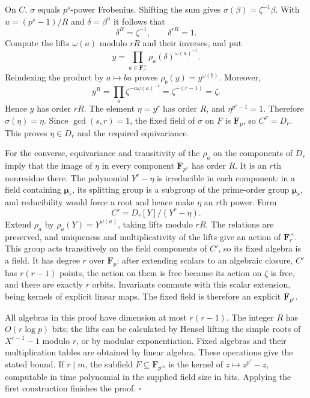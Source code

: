 On $C$, $\sigma$ equals $p^s$-power Frobenius. Shifting the sum gives
$\sigma(\beta)=\zeta^{-1}\beta$. With $u=(p^s-1)/R$ and
$\delta=\beta^u$ it follows that
\[
                  \delta^R=\zeta^{-1},\qquad \delta^{rR}=1.
\]
Compute the lifts $\omega(a)$ modulo $rR$ and their inverses, and put
\[
          y=\prod_{a\in\mathbf F_r^\times}
                        \rho_a(\delta)^{\omega(a)^{-1}}.
\]
Reindexing the product by $a\mapsto ba$ proves
$\rho_b(y)=y^{\omega(b)}$. Moreover,
\[
          y^R=\prod_a\zeta^{-a\omega(a)^{-1}}
                   =\zeta^{-(r-1)}=\zeta.
\]
Hence $y$ has order $rR$. The element $\eta=y^r$ has order $R$,
and $\eta^{p^s-1}=1$. Therefore $\sigma(\eta)=\eta$.
Since $\gcd(s,r)=1$, the fixed field of $\sigma$ on $F$ is
$\mathbf F_p$, so $C^\sigma=D_r$. This proves $\eta\in D_r$ and
the required equivariance.

For the converse, equivariance and transitivity of the $\rho_a$ on the
components of $D_r$ imply that the image of $\eta$ in every component
$\mathbf F_{p^s}$ has order $R$. It is an $r$th nonresidue there.
The polynomial $Y^r-\eta$ is irreducible in each component: in a field
containing $\boldsymbol\mu_r$, its splitting group is a subgroup of
the prime-order group $\boldsymbol\mu_r$, and reducibility would force
a root and hence make $\eta$ an $r$th power. Form
\[
                       C'=D_r[Y]/(Y^r-\eta).
\]
Extend $\rho_a$ by $\rho_a(Y)=Y^{\omega(a)}$, taking lifts modulo
$rR$. The relations are preserved, and uniqueness and multiplicativity
of the lifts give an action of $\mathbf F_r^\times$.
This group acts transitively on the field components of $C'$, so its
fixed algebra is a field. It has degree $r$ over $\mathbf F_p$:
after extending scalars to an algebraic closure, $C'$ has $r(r-1)$
points, the action on them is free because its action on $\zeta$ is
free, and there are exactly $r$ orbits. Invariants commute with this
scalar extension, being kernels of explicit linear maps. The fixed
field is therefore an explicit $\mathbf F_{p^r}$.

All algebras in this proof have dimension at most $r(r-1)$.
The integer $R$ has $O(r\log p)$ bits; the lifts can be calculated by
Hensel lifting the simple roots of $X^{r-1}-1$ modulo $r$, or by
modular exponentiation. Fixed algebras and their multiplication tables
are obtained by linear algebra. These operations give the stated bound.
If $r\mid m$, the subfield $F\subseteq\mathbf F_{p^m}$ is the kernel
of $z\mapsto z^{p^r}-z$, computable in time polynomial in the supplied
field size in bits. Applying the first construction finishes the proof.
\hfill$\square$


